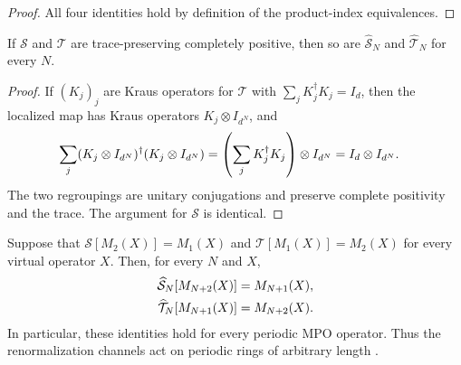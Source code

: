 \begin{proof}
    \leanok
    All four identities hold by definition of the product-index equivalences.
\end{proof}

\begin{lemma}
    \label{lem:mpdo_global_renormalization_maps_cptp}
    \leanok
    If $\mathcal S$ and $\mathcal T$ are trace-preserving completely positive,
    then so are $\widehat{\mathcal S}_N$ and
    $\widehat{\mathcal T}_N$ for every $N$.
\end{lemma}

\begin{proof}
    \leanok
    If $(K_j)_j$ are Kraus operators for $\mathcal T$ with
    $\sum_j K_j^\dagger K_j=I_d$, then the localized map has Kraus operators
    $K_j\otimes I_{d^N}$, and
    \begin{align}
        \sum_j(K_j\otimes I_{d^N})^\dagger(K_j\otimes I_{d^N})
         & =\left(\sum_j K_j^\dagger K_j\right)\otimes I_{d^N}
        =I_d\otimes I_{d^N}.
        \notag
    \end{align}
    The two regroupings are unitary conjugations and preserve complete
    positivity and the trace. The argument for $\mathcal S$ is identical.
\end{proof}

\begin{lemma}
    \label{thm:mpdo_global_renormalization_maps}
    \leanok
    Suppose that $\mathcal S[M_2(X)]=M_1(X)$ and
    $\mathcal T[M_1(X)]=M_2(X)$ for every virtual operator $X$. Then, for
    every $N$ and $X$,
    \begin{align}
        \widehat{\mathcal S}_N[M_{N+2}(X)]
         & =M_{N+1}(X),
        \notag          \\
        \widehat{\mathcal T}_N[M_{N+1}(X)]
         & =M_{N+2}(X).
        \notag
    \end{align}
    In particular, these identities hold for every periodic MPO operator.
    Thus the renormalization channels act on periodic rings of arbitrary
    length \cite[Appendix~C, lines~1333--1341]{Cirac2016MPDO_arXiv}.
\end{lemma}

